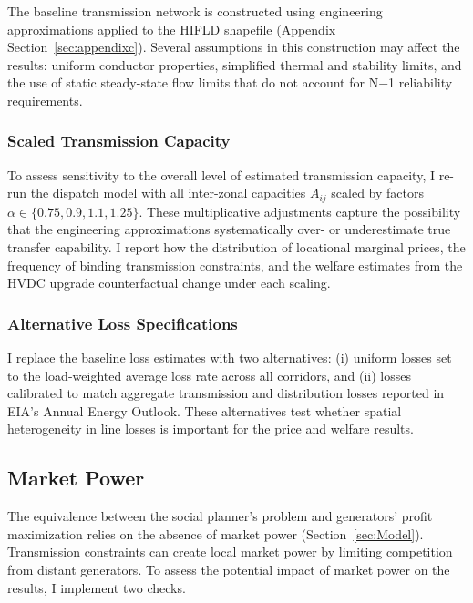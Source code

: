 \documentclass[12pt]{article}
\begin{document}
The baseline transmission network is constructed using engineering approximations applied to the HIFLD shapefile (Appendix Section~\ref{sec:appendixc}). Several assumptions in this construction may affect the results: uniform conductor properties, simplified thermal and stability limits, and the use of static steady-state flow limits that do not account for N$-$1 reliability requirements.

\subsubsection{Scaled Transmission Capacity}

To assess sensitivity to the overall level of estimated transmission capacity, I re-run the dispatch model with all inter-zonal capacities $A_{ij}$ scaled by factors $\alpha \in \{0.75, 0.9, 1.1, 1.25\}$. These multiplicative adjustments capture the possibility that the engineering approximations systematically over- or underestimate true transfer capability. I report how the distribution of locational marginal prices, the frequency of binding transmission constraints, and the welfare estimates from the HVDC upgrade counterfactual change under each scaling.

\subsubsection{Alternative Loss Specifications}

I replace the baseline loss estimates with two alternatives: (i) uniform losses set to the load-weighted average loss rate across all corridors, and (ii) losses calibrated to match aggregate transmission and distribution losses reported in EIA's Annual Energy Outlook. These alternatives test whether spatial heterogeneity in line losses is important for the price and welfare results.


\subsection{Market Power}\label{app:robustness:marketpower}

The equivalence between the social planner's problem and generators' profit maximization relies on the absence of market power (Section~\ref{sec:Model}). Transmission constraints can create local market power by limiting competition from distant generators. To assess the potential impact of market power on the results, I implement two checks.
\end{document}
